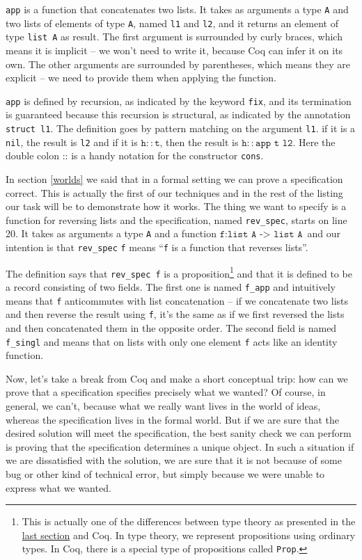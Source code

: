 \documentclass[declaration,mgr,english,shortabstract]{iithesis}
\newcommand{\m}[1]{\texttt{#1}}
\begin{document}
\m{app} is a function that concatenates two lists. It takes as arguments a type \m{A} and two lists of elements of type \m{A}, named \m{l1} and \m{l2}, and it returns an element of type \m{list A} as result. The first argument is surrounded by curly braces, which means it is implicit -- we won't need to write it, because Coq can infer it on its own. The other arguments are surrounded by parentheses, which means they are explicit -- we need to provide them when applying the function.

\m{app} is defined by recursion, as indicated by the keyword \m{fix}, and its termination is guaranteed because this recursion is structural, as indicated by the annotation \m{struct l1}. The definition goes by pattern matching on the argument \m{l1}. if it is a \m{nil}, the result is \m{l2} and if it is $\m{h} :: \m{t}$, then the result is $\m{h} :: \m{app t l2}$. Here the double colon $\m{::}$ is a handy notation for the constructor \m{cons}.

In section \ref{worlds} we said that in a formal setting we can prove a specification correct. This is actually the first of our techniques and in the rest of the listing our task will be to demonstrate how it works. The thing we want to specify is a function for reversing lists and the specification, named \m{rev\_spec}, starts on line 20. It takes as arguments a type \m{A} and a function $\m{f} : \m{list A -> list A}$ and our intention is that \m{rev\_spec} \m{f} means ``\m{f} is a function that reverses lists''.

The definition says that \m{rev\_spec f} is a proposition\footnote{This is actually one of the differences between type theory as presented in the \hyperref[mltt]{last section} and Coq. In type theory, we represent propositions using ordinary types. In Coq, there is a special type of propositions called \m{Prop}.} and that it is defined to be a record consisting of two fields. The first one is named \m{f\_app} and intuitively means that \m{f} anticommutes with list concatenation -- if we concatenate two lists and then reverse the result using \m{f}, it's the same as if we first reversed the lists and then concatenated them in the opposite order. The second field is named \m{f\_singl} and means that on lists with only one element \m{f} acts like an identity function.

Now, let's take a break from Coq and make a short conceptual trip: how can we prove that a specification specifies precisely what we wanted? Of course, in general, we can't, because what we really want lives in the world of ideas, whereas the specification lives in the formal world. But if we are sure that the desired solution will meet the specification, the best sanity check we can perform is proving that the specification determines a unique object.
In such a situation if we are dissatisfied with the solution, we are sure that it is not because of some bug or other kind of technical error, but simply because we were unable to express what we wanted.
\end{document}
